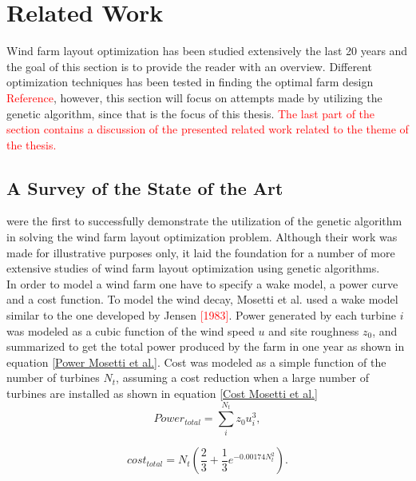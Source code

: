 \chapter{Related Work}


Wind farm layout optimization has been studied extensively the last 20 years and the goal of this section is to provide the reader with an overview. Different optimization techniques has been tested in finding the optimal farm design \textcolor{red}{Reference}, however, this section will focus on attempts made by utilizing the genetic algorithm, since that is the focus of this thesis. \textcolor{red}{The last part of the section contains a discussion of the presented related work related to the theme of the thesis.} 


\section{A Survey of the State of the Art}


\cite{Mosetti} were the first to successfully demonstrate the utilization of the genetic algorithm in solving the wind farm layout optimization problem. Although their work was made for illustrative purposes only, it laid the foundation for a number of more extensive studies of wind farm layout optimization using genetic algorithms.\\

\noindent In order to model a wind farm one have to specify a wake model, a power curve and a cost function. To model the wind decay, Mosetti et al. used a wake model similar to the one developed by Jensen \textcolor{red}{[1983]}. Power generated by each turbine $i$ was modeled as a cubic function of the wind speed $u$ and site roughness $z_0$, and summarized to get the total power produced by the farm in one year as shown in equation \ref{Power Mosetti et al.}. Cost was modeled as a simple function of the number of turbines $N_t$, assuming a cost reduction when a large number of turbines are installed as shown in equation \ref{Cost Mosetti et al.} \\


\begin{equation}
\label{Power Mosetti et al.}
Power_{total} = \sum^{N_t}_{i} z_0u_i^3,
\end{equation}


\begin{equation}
\label{Cost Mosetti et al.}
cost_{total} = N_t \left( \frac{2}{3} + \frac{1}{3}e^{-0.00174N_t^2} \right).
\end{equation}

